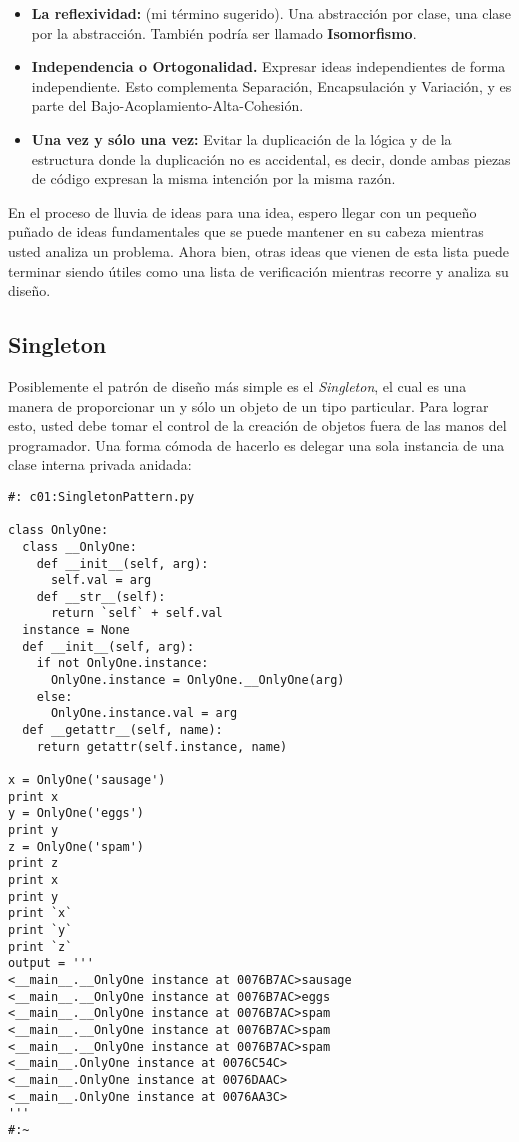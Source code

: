\begin{itemize}
    \item \textbf{La reflexividad:} (mi término sugerido). Una abstracción por clase, una clase por la abstracción. También podría ser llamado \textbf{Isomorfismo}.
    
    \item \textbf{Independencia o Ortogonalidad.} Expresar ideas independientes de forma independiente. Esto complementa Separación, Encapsulación y Variación, y es parte del Bajo-Acoplamiento-Alta-Cohesión.
    
    \item \textbf{Una vez y sólo una vez:} Evitar la duplicación de la lógica y de la estructura donde la duplicación no es accidental, es decir, donde ambas piezas de código expresan la misma intención por la misma razón.

\end{itemize}

En el proceso de lluvia de ideas para una idea, espero llegar con un pequeño puñado de ideas fundamentales que se puede mantener en su cabeza mientras usted analiza un problema. Ahora bien, otras ideas que vienen de esta lista puede terminar siendo útiles como una lista de verificación mientras recorre y analiza su diseño.  \newline

\subsection{Singleton}

Posiblemente el patrón de diseño más simple es el \textit{Singleton}, 
el cual es una manera de proporcionar un y sólo un objeto de un tipo particular. Para lograr esto, usted debe tomar el control de la creación de objetos fuera de las manos del programador. Una forma cómoda de hacerlo es delegar una sola instancia de una clase interna privada anidada:    \newline %

 \begin{lstlisting}
#: c01:SingletonPattern.py 

class OnlyOne: 
  class __OnlyOne: 
    def __init__(self, arg): 
      self.val = arg 
    def __str__(self): 
      return `self` + self.val 
  instance = None 
  def __init__(self, arg): 
    if not OnlyOne.instance: 
      OnlyOne.instance = OnlyOne.__OnlyOne(arg) 
    else: 
      OnlyOne.instance.val = arg 
  def __getattr__(self, name): 
    return getattr(self.instance, name) 
    
x = OnlyOne('sausage') 
print x 
y = OnlyOne('eggs') 
print y 
z = OnlyOne('spam') 
print z 
print x 
print y 
print `x` 
print `y` 
print `z` 
output = ''' 
<__main__.__OnlyOne instance at 0076B7AC>sausage 
<__main__.__OnlyOne instance at 0076B7AC>eggs 
<__main__.__OnlyOne instance at 0076B7AC>spam 
<__main__.__OnlyOne instance at 0076B7AC>spam 
<__main__.__OnlyOne instance at 0076B7AC>spam 
<__main__.OnlyOne instance at 0076C54C> 
<__main__.OnlyOne instance at 0076DAAC> 
<__main__.OnlyOne instance at 0076AA3C> 
''' 
#:~ 
 \end{lstlisting}

